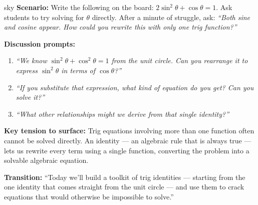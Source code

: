 \documentclass[10pt]{article}
\begin{document}
\begin{skillbox}{sky}
\textbf{Scenario:} Write the following on the board: $2\sin^2\theta + \cos\theta = 1$.
Ask students to try solving for $\theta$ directly. After a minute of struggle,
ask: \textit{``Both sine and cosine appear. How could you rewrite this with
only \emph{one} trig function?''}

\textbf{Discussion prompts:}
\begin{enumerate}[leftmargin=1.4em, itemsep=3pt]
  \item \textit{``We know $\sin^2\theta + \cos^2\theta = 1$ from the unit
    circle. Can you rearrange it to express $\sin^2\theta$ in terms of
    $\cos\theta$?''}
  \item \textit{``If you substitute that expression, what kind of equation
    do you get? Can you solve it?''}
  \item \textit{``What other relationships might we derive from that single
    identity?''}
\end{enumerate}

\textbf{Key tension to surface:} Trig equations involving more than one
function often cannot be solved directly. An identity --- an algebraic rule
that is always true --- lets us rewrite every term using a single function,
converting the problem into a solvable algebraic equation.

\textbf{Transition:} ``Today we'll build a toolkit of trig identities ---
starting from the one identity that comes straight from the unit circle ---
and use them to crack equations that would otherwise be impossible to solve.''
\end{skillbox}

\vspace{0.08in}
\end{document}

